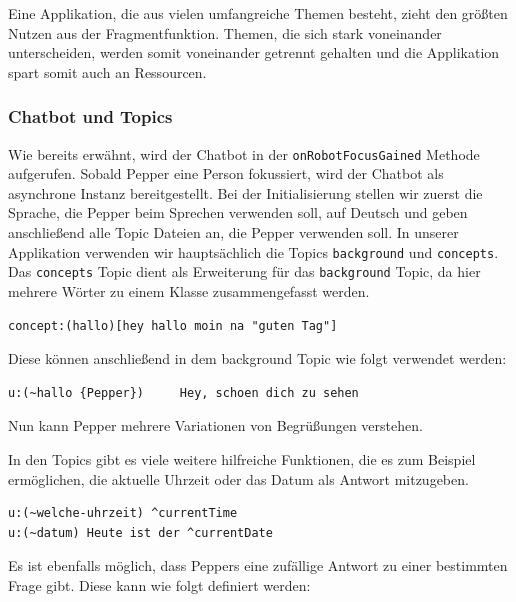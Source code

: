 Eine Applikation, die aus vielen umfangreiche Themen besteht, zieht den größten Nutzen aus der Fragmentfunktion. Themen, die sich stark voneinander unterscheiden, werden somit voneinander getrennt gehalten und die Applikation spart somit auch an Ressourcen.\\

\subsubsection{Chatbot und Topics}

Wie bereits erwähnt, wird der Chatbot in der \verb|onRobotFocusGained| Methode aufgerufen. Sobald Pepper eine Person fokussiert, wird der Chatbot als asynchrone Instanz bereitgestellt. Bei der Initialisierung stellen wir zuerst die Sprache, die Pepper beim Sprechen verwenden soll, auf Deutsch und geben anschließend alle Topic Dateien an, die Pepper verwenden soll. In unserer Applikation verwenden wir hauptsächlich die Topics \verb|background| und \verb|concepts|. Das \verb|concepts| Topic dient als Erweiterung für das \verb|background| Topic, da hier mehrere Wörter zu einem Klasse zusammengefasst werden.\\ 

\begin{lstlisting}[caption={Konzept - Beispiel}]
concept:(hallo)[hey hallo moin na "guten Tag"]
\end{lstlisting}

Diese können anschließend in dem background Topic wie folgt verwendet werden:\\

\begin{lstlisting}[caption={Topic - Beispiel}]
u:(~hallo {Pepper}) 	Hey, schoen dich zu sehen
\end{lstlisting}

Nun kann Pepper mehrere Variationen von Begrüßungen verstehen.

In den Topics gibt es viele weitere hilfreiche Funktionen, die es zum Beispiel ermöglichen, die aktuelle Uhrzeit oder das Datum als Antwort 
mitzugeben. \\

\begin{lstlisting}[caption={Topic - Datum}]
u:(~welche-uhrzeit) ^currentTime
u:(~datum) Heute ist der ^currentDate
\end{lstlisting}

Es ist ebenfalls möglich, dass Peppers eine zufällige Antwort zu einer bestimmten Frage gibt. Diese kann wie folgt definiert werden:\\

